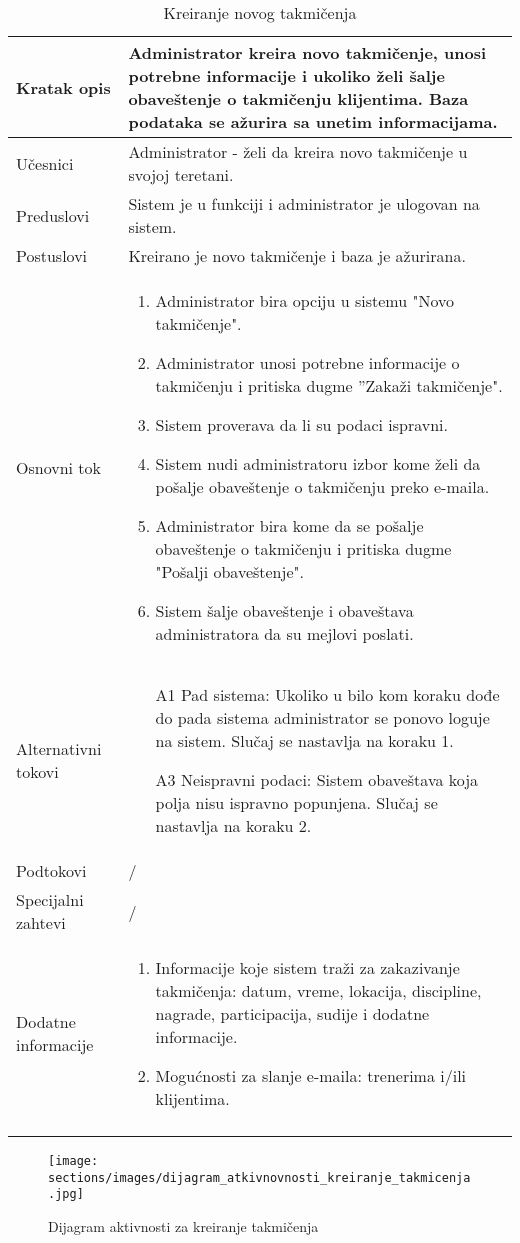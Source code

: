 \documentclass[../../main.tex]{subfiles}
\begin{document}
\begin{longtable}{| p{} | p{} |} 
\hline
    Kratak opis &  Administrator kreira novo takmičenje, unosi potrebne informacije i ukoliko želi šalje obaveštenje o takmičenju klijentima. Baza podataka se ažurira sa unetim informacijama.\\ 
\hline    
    Učesnici & Administrator - želi da kreira novo takmičenje u svojoj teretani.\\
\hline
   Preduslovi & Sistem je u funkciji i administrator je ulogovan na sistem. \\
\hline  
    Postuslovi & Kreirano je novo takmičenje i baza je ažurirana.\\
\hline
    Osnovni tok & \begin{enumerate}
        \item Administrator bira opciju u sistemu "Novo takmičenje".
        \item Administrator unosi potrebne informacije o takmičenju i pritiska dugme ''Zakaži takmičenje".
        \item Sistem proverava da li su podaci ispravni.
        \item Sistem nudi administratoru izbor kome želi da pošalje obaveštenje o takmičenju preko e-maila.
        \item Administrator bira kome da se pošalje obaveštenje o takmičenju i pritiska dugme "Pošalji obaveštenje".
        \item Sistem šalje obaveštenje i obaveštava administratora da su mejlovi poslati.
    \end{enumerate}\\
\hline
    Alternativni tokovi &  \begin{itemize}
        \item[A1] Pad sistema: Ukoliko u bilo kom koraku dođe do pada sistema administrator se ponovo loguje na sistem. Slučaj se nastavlja na koraku 1.  
        \item[A3] Neispravni podaci: Sistem obaveštava koja polja nisu ispravno popunjena. Slučaj se nastavlja na koraku 2.
    \end{itemize}\\
\hline
    Podtokovi & /\\
\hline
    Specijalni zahtevi & /\\
\hline
    Dodatne informacije & \begin{enumerate}
        \item Informacije koje sistem traži za zakazivanje takmičenja: datum, vreme, lokacija, discipline, nagrade, participacija, sudije i dodatne informacije.
        \item Mogućnosti za slanje e-maila: trenerima i/ili klijentima.
    \end{enumerate}\\
\hline
\caption{Kreiranje novog takmičenja}
\end{longtable}

\begin{figure}[!ht]
\begin{center}
\texttt{[image: sections/images/dijagram\_atkivnovnosti\_kreiranje\_takmicenja.jpg]}
\end{center}
\caption{Dijagram aktivnosti za kreiranje takmičenja}
\label{fig:kontekst}
\end{figure}
\end{document}
